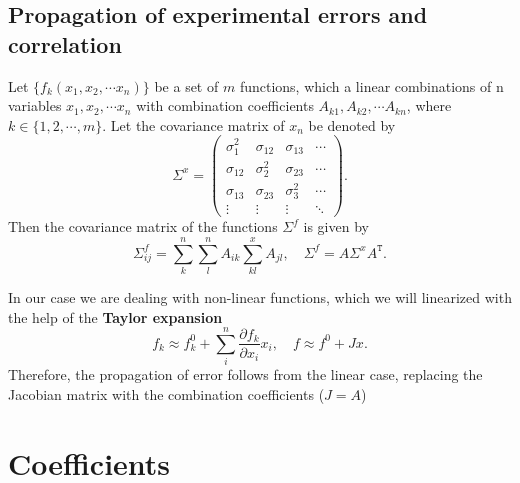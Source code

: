 \documentclass[../../index.tex]{subfiles}
\begin{document}
  \section{Propagation of experimental errors and correlation}
  Let $\{f_k(x_1, x_2, \cdots x_n)\}$ be a set of $m$ functions, which a linear
  combinations of n variables $x_1, x_2, \cdots x_n$ with combination
  coefficients $A_{k1}, A_{k2}, \cdots A_{kn}$, where $k \in \{1, 2, \cdots,
  m\}$. Let the covariance matrix of $x_n$ be denoted by
  \begin{equation}
    \Sigma^x =
    \begin{pmatrix}
      \sigma_{1}^2 & \sigma_{12}  & \sigma_{13}  & \cdots \\
      \sigma_{12}  & \sigma_{2}^2 & \sigma_{23}  & \cdots \\
      \sigma_{13}  & \sigma_{23}  & \sigma_{3}^2 & \cdots \\
      \vdots      & \vdots       & \vdots      &  \ddots
    \end{pmatrix}.
  \end{equation}
  Then the covariance matrix of the functions $\Sigma^f$ is given by
  \begin{equation}
    \Sigma_{ij}^f = \sum_k^n \sum_l^n A_{ik} \sum_{kl}^x A_{jl}, \quad \Sigma^f= A \Sigma^x A^{\mathtt{T}}.
  \end{equation}

  In our case we are dealing with non-linear functions, which we will
  linearized with the help of the \textbf{Taylor expansion}
  \begin{equation}
    f_k \approx f_k^0 + \sum_i^n \frac{\partial f_k}{\partial x_i} x_i, \quad f \approx f^0 + Jx.
  \end{equation}
  Therefore, the propagation of error follows from the linear case, replacing
  the Jacobian matrix with the combination coefficients ($J = A$)

  \chapter{Coefficients}
  \label{app:coefficients}
\end{document}
